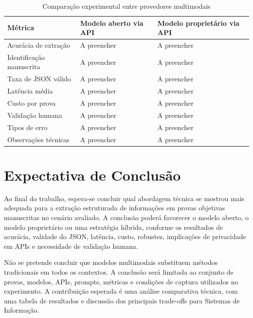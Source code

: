 \begin{table}[htb]
\centering
\caption{Comparação experimental entre provedores multimodais}
\label{tab:comparacao-provedores}
\small
\begin{tabular}{|p{4cm}|p{4cm}|p{4cm}|}
\hline
\textbf{Métrica} & \textbf{Modelo aberto via API} & \textbf{Modelo proprietário via API} \\
\hline
Acurácia de extração & A preencher & A preencher \\
\hline
Identificação manuscrita & A preencher & A preencher \\
\hline
Taxa de JSON válido & A preencher & A preencher \\
\hline
Latência média & A preencher & A preencher \\
\hline
Custo por prova & A preencher & A preencher \\
\hline
Validação humana & A preencher & A preencher \\
\hline
Tipos de erro & A preencher & A preencher \\
\hline
Observações técnicas & A preencher & A preencher \\
\hline
\end{tabular}
\end{table}

\chapter{Expectativa de Conclusão}

Ao final do trabalho, espera-se concluir qual abordagem técnica se mostrou mais adequada para a extração estruturada de informações em provas objetivas manuscritas no cenário avaliado. A conclusão poderá favorecer o modelo aberto, o modelo proprietário ou uma estratégia híbrida, conforme os resultados de acurácia, validade do JSON, latência, custo, robustez, implicações de privacidade em APIs e necessidade de validação humana.

Não se pretende concluir que modelos multimodais substituem métodos tradicionais em todos os contextos. A conclusão será limitada ao conjunto de provas, modelos, APIs, prompts, métricas e condições de captura utilizados no experimento. A contribuição esperada é uma análise comparativa técnica, com uma tabela de resultados e discussão dos principais trade-offs para Sistemas de Informação.
